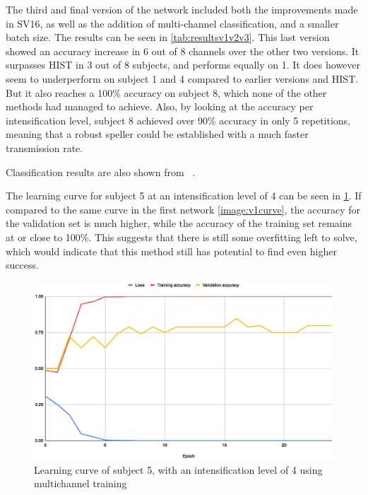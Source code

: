 \documentclass[conference]{IEEEtran}
\begin{document}
The third and final version of the network included both the improvements made in SV16, as well as the addition of multi-channel classification, and a smaller batch size. The results can be seen in \ref{tab:resultsv1v2v3}. This last version showed an accuracy increase in 6 out of 8 channels over the other two versions. It surpasses HIST in 3 out of 8 subjects, and performs equally on 1. 
It does however seem to underperform on subject 1 and 4 compared to earlier versions and HIST. But it also reaches a 100\% accuracy on subject 8, which none of the other methods had managed to achieve.
Also, by looking at the accuracy per intensification level, subject 8 achieved over 90\% accuracy in only 5 repetitions, meaning that a robust speller could be established with a much faster transmission rate. 

Classification results are also shown from ~\cite{Zhang.etal2020}.

The learning curve for subject 5 at an intensification level of 4 can be seen in \ref{image:v3curve}. If compared to the same curve in the first network \ref{image:v1curve}, the accuracy for the validation set is much higher, while the accuracy of the training set remains at or close to 100\%. This suggests that there is still some overfitting left to solve, which would indicate that this method still has potential to find even higher success.


\begin{figure}[h]
  \centering
  \includegraphics[width=\linewidth]{images/v3curve.eps}
  \caption[MSV16 Learning curve]{Learning curve of subject 5, with an intensification level of 4 using multichannel training}
  \label{image:v3curve}
\end{figure}
\end{document}
